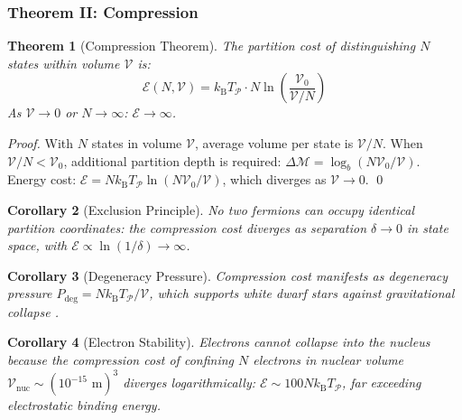 \documentclass[twocolumn,10pt,a4paper]{article}
\newtheorem{theorem}{Theorem}[section]
\newtheorem{corollary}[theorem]{Corollary}
\theoremstyle{definition}
\theoremstyle{remark}
\newcommand{\kB}{k_{\mathrm{B}}}
\newcommand{\Depth}{\mathcal{M}}
\newcommand{\Cost}{\mathcal{E}}
\newcommand{\Partition}{\mathcal{P}}
\begin{document}
\subsubsection{Theorem II: Compression}

\begin{theorem}[Compression Theorem]
\label{thm:compression}
The partition cost of distinguishing $N$ states within volume $\mathcal{V}$ is:
\begin{equation}
    \Cost(N, \mathcal{V}) = \kB T_{\Partition} \cdot N \ln\left(\frac{\mathcal{V}_0}{\mathcal{V}/N}\right)
\end{equation}
As $\mathcal{V} \to 0$ or $N \to \infty$: $\Cost \to \infty$.
\end{theorem}

\begin{proof}
With $N$ states in volume $\mathcal{V}$, average volume per state is $\mathcal{V}/N$. When $\mathcal{V}/N < \mathcal{V}_0$, additional partition depth is required: $\Delta\Depth = \log_b(N\mathcal{V}_0/\mathcal{V})$. Energy cost: $\Cost = N \kB T_{\Partition} \ln(N\mathcal{V}_0/\mathcal{V})$, which diverges as $\mathcal{V} \to 0$. \qed
\end{proof}

\begin{corollary}[Exclusion Principle]
\label{cor:exclusion}
No two fermions can occupy identical partition coordinates: the compression cost diverges as separation $\delta \to 0$ in state space, with $\Cost \propto \ln(1/\delta) \to \infty$.
\end{corollary}

\begin{corollary}[Degeneracy Pressure]
\label{cor:degeneracy}
Compression cost manifests as degeneracy pressure $P_{\text{deg}} = N\kB T_{\Partition}/\mathcal{V}$, which supports white dwarf stars against gravitational collapse \citep{chandrasekhar1931,fowler1926}.
\end{corollary}

\begin{corollary}[Electron Stability]
\label{cor:electron-stability}
Electrons cannot collapse into the nucleus because the compression cost of confining $N$ electrons in nuclear volume $\mathcal{V}_{\text{nuc}} \sim (10^{-15}\text{ m})^3$ diverges logarithmically: $\Cost \sim 100 N\kB T_{\Partition}$, far exceeding electrostatic binding energy.
\end{corollary}
\end{document}
